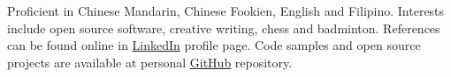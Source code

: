 \documentclass[10.5pt]{article}
\begin{document}
\shortskip
{}

\begin{longtext}
Proficient in Chinese Mandarin, Chinese Fookien, English and Filipino. Interests include open source software, creative writing, chess and badminton. References can be found online in \href{http://www.linkedin.com/in/waynesee}{LinkedIn} profile page. Code samples and open source projects are available at personal \href{http://github.com/weynsee}{GitHub} repository.

\\
\end{longtext}
\end{document}
